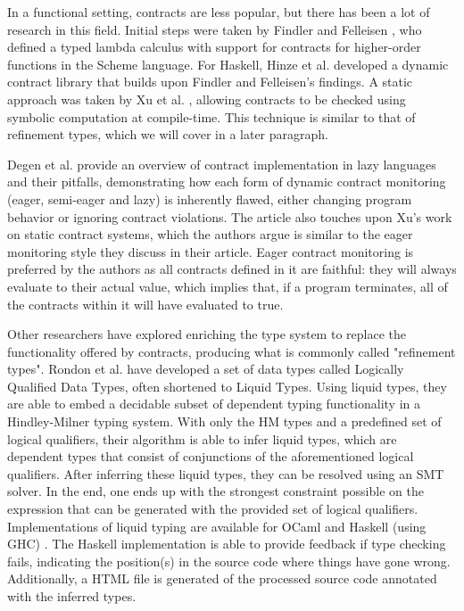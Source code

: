 \documentclass[10pt]{report}
\begin{document}
In a functional setting, contracts are less popular, but there has been a lot of research in this field.
Initial steps were taken by Findler and Felleisen \cite{Findler:2002:CHF:583852.581484}, who defined a typed lambda calculus with support for contracts for higher-order functions in the Scheme language.
For Haskell, Hinze et al. \cite{Hinze06typedcontracts} developed a dynamic contract library that builds upon Findler and Felleisen's findings. 
A static approach was taken by Xu et al. \cite{Xu:2006ul, Xu:2009:SCC:1594834.1480889}, allowing contracts to be checked using symbolic computation at compile-time. This technique is similar to that of refinement types, which we will cover in a later paragraph.

Degen et al. \cite{DegenThiemannWehr2009} provide an overview of contract implementation in lazy languages and their pitfalls, demonstrating how each form of dynamic contract monitoring (eager, semi-eager and lazy) is inherently flawed, either changing program behavior or ignoring contract violations.
The article also touches upon Xu's work on static contract systems, which the authors argue is similar to the eager monitoring style they discuss in their article.
Eager contract monitoring is preferred by the authors as all contracts defined in it are faithful: they will always evaluate to their actual value, which implies that, if a program terminates, all of the contracts within it will have evaluated to true.

Other researchers have explored enriching the type system to replace the functionality offered by contracts, producing what is commonly called "refinement types".
Rondon et al. \cite{rondon2008liquid} have developed a set of data types called Logically Qualified Data Types, often shortened to Liquid Types.
Using liquid types, they are able to embed a decidable subset of dependent typing functionality in a Hindley-Milner typing system.
With only the HM types and a predefined set of logical qualifiers, their algorithm is able to infer liquid types, which are dependent types that consist of conjunctions of the aforementioned logical qualifiers.
After inferring these liquid types, they can be resolved using an SMT solver.
In the end, one ends up with the strongest constraint possible on the expression that can be generated with the provided set of logical qualifiers.
Implementations of liquid typing are available for OCaml \cite{rondon2008liquid} and Haskell (using GHC) \cite{rondon2013refinement}.
The Haskell implementation is able to provide feedback if type checking fails, indicating the position(s) in the source code where things have gone wrong.
Additionally, a HTML file is generated of the processed source code annotated with the inferred types.
\end{document}
